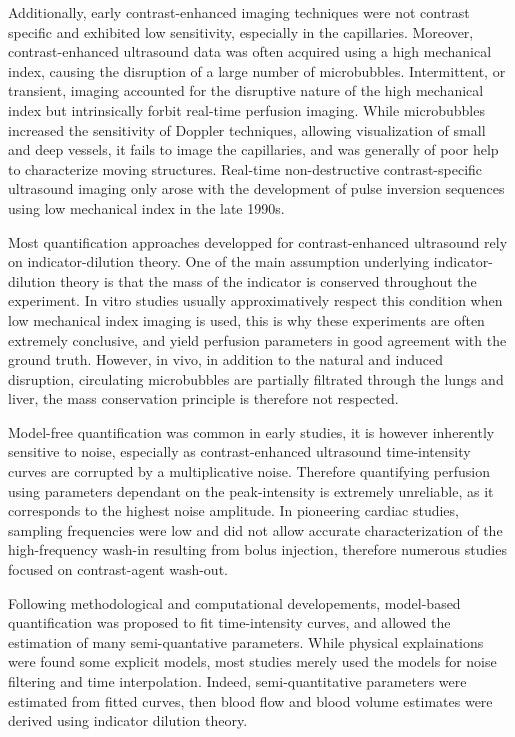 Additionally, early contrast-enhanced imaging techniques were not contrast specific and exhibited low sensitivity, especially in the capillaries.
Moreover, contrast-enhanced ultrasound data was often acquired using a high mechanical index, causing the disruption of a large number of microbubbles.
Intermittent, or transient, imaging accounted for the disruptive nature of the high mechanical index but intrinsically forbit real-time perfusion imaging.
While microbubbles increased the sensitivity of Doppler techniques, allowing visualization of small and deep vessels, it fails to image the capillaries, and was generally of poor help to characterize moving structures.
Real-time non-destructive contrast-specific ultrasound imaging only arose with the development of pulse inversion sequences using low mechanical index in the late 1990s.

Most quantification approaches developped for contrast-enhanced ultrasound rely on indicator-dilution theory.
One of the main assumption underlying indicator-dilution theory is that the mass of the indicator is conserved throughout the experiment.
In vitro studies usually approximatively respect this condition when low mechanical index imaging is used, this is why these experiments are often extremely conclusive, and yield perfusion parameters in good agreement with the ground truth. 
However, in vivo, in addition to the natural and induced disruption, circulating microbubbles are partially filtrated through the lungs and liver, the mass conservation principle is therefore not respected.

Model-free quantification was common in early studies, it is however inherently sensitive to noise, especially as contrast-enhanced ultrasound time-intensity curves are corrupted by a multiplicative noise.
Therefore quantifying perfusion using parameters dependant on the peak-intensity is extremely unreliable, as it corresponds to the highest noise amplitude.
In pioneering cardiac studies, sampling frequencies were low and did not allow accurate characterization of the high-frequency wash-in resulting from bolus injection, therefore numerous studies focused on contrast-agent wash-out.

Following methodological and computational developements, model-based quantification was proposed to fit time-intensity curves, and allowed the estimation of many semi-quantative parameters. 
While physical explainations were found some explicit models, most studies merely used the models for noise filtering and time interpolation.
Indeed, semi-quantitative parameters were estimated from fitted curves, then blood flow and blood volume estimates were derived using indicator dilution theory.

